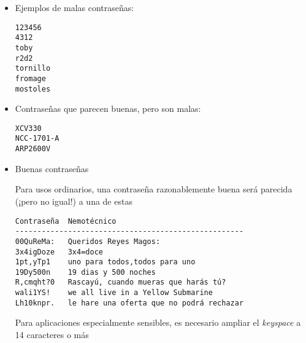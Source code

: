 \documentclass[ucs]{beamer}
\begin{document}
\begin{frame}[fragile]


\begin{itemize}

\item
Ejemplos de malas contraseñas:
  \begin{footnotesize}
  \begin{verbatim}
123456
4312
toby
r2d2
tornillo
fromage
mostoles
  \end{verbatim}
  \end{footnotesize}
\item
Contraseñas que parecen buenas, pero son malas:
  \begin{footnotesize}
  \begin{verbatim}
XCV330
NCC-1701-A 
ARP2600V

  \end{verbatim}
  \end{footnotesize}

\end{itemize}
\end{frame}
\begin{frame}[fragile]
\begin{itemize}

\item

Buenas contraseñas

Para usos ordinarios, una contraseña razonablemente buena será parecida (¡pero no igual!)
a una de estas


  \begin{footnotesize}
  \begin{verbatim}
Contraseña  Nemotécnico
----------------------------------------------------
00QuReMa:   Queridos Reyes Magos:
3x4igDoze   3x4=doce
1pt,yTp1    uno para todos,todos para uno
19Dy500n    19 dias y 500 noches
R,cmqht?0   Rascayú, cuando mueras que harás tú?
wali1YS!    we all live in a Yellow Submarine
Lh10knpr.   le hare una oferta que no podrá rechazar
  \end{verbatim}
  \end{footnotesize}

Para aplicaciones especialmente sensibles, es necesario ampliar
el \emph{keyspace} a 14 caracteres o más


\end{itemize}

\end{frame}
\end{document}
